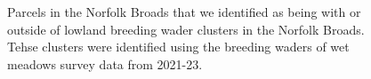 \documentclass[
  12pt,
  letterpaper,
  DIV=11,
  numbers=noendperiod]{scrartcl}
\begin{document}
\begin{figure}[H]


\caption{\label{fig-BroadsLawton}Parcels in the Norfolk Broads that we
identified as being with or outside of lowland breeding wader clusters
in the Norfolk Broads. Tehse clusters were identified using the breeding
waders of wet meadows survey data from 2021-23.}

\end{figure}%
\end{document}
